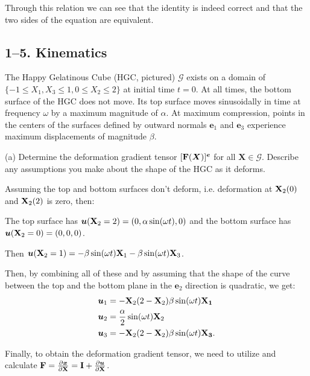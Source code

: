 Through this relation we can see that the identity is indeed correct and that the two sides of the equation are equivalent.

\newpage
\subsection*{1--5. \textbf{Kinematics}}
The Happy Gelatinous Cube (HGC, pictured) $\mathcal{G}$ exists on a domain of $\{-1\leq X_1 , X_3\leq1, 0\leq X_2 \leq 2\}$ at initial time $t=0$. 
At all times, the bottom surface of the HGC does not move. 
Its top surface moves sinusoidally in time at frequency $\omega$ by a maximum magnitude of $\alpha$. 
At maximum compression, points in the centers of the surfaces defined by outward normals $\bm{e}_1$ and $\bm{e}_3$ experience maximum displacements of magnitude $\beta$. 

\begin{figure}[h!]
\centering
{}
\end{figure}

\medskip
(a) Determine the deformation gradient tensor $[\mathbf{F}(\bm{X})]^{\bm{e}}$ for all $\bm{X}\in \mathcal{G}$. 
Describe any assumptions you make about the shape of the HGC as it deforms.

Assuming the top and bottom surfaces don't deform, i.e. deformation at $\mathbf{X}_2 (0)$ and $\mathbf{X}_2 (2)$ is zero, then:

The top surface has $\bm{u} (\mathbf{X}_2 = 2) = (0, \alpha \sin (\omega t), 0)$ and the bottom surface has $\bm{u} (\mathbf{X}_2 = 0) = (0, 0, 0)$.

Then $\bm{u} (\mathbf{X}_2 = 1) = -\beta \sin (\omega t) \mathbf{X}_1 - \beta \sin (\omega t) \mathbf{X}_3$.

Then, by combining all of these and by assuming that the shape of the curve between the top and the bottom plane in the $\bm{e}_2$ direction is quadratic, we get:
\begin{align*}
    \bm{u}_1 &= -\mathbf{X}_2 (2-\mathbf{X}_2) \beta \sin (\omega t) \mathbf{X_1}\\
    \bm{u}_2 &= \frac{\alpha}{2} \sin (\omega t) \mathbf{X}_2\\
    \bm{u}_3 &= -\mathbf{X}_2 (2-\mathbf{X}_2) \beta \sin (\omega t) \mathbf{X_3}.
\end{align*}

Finally, to obtain the deformation gradient tensor, we need to utilize and calculate $\mathbf{F} = \frac{\partial \bm{x}}{\partial \mathbf{X}} = \mathbf{I} + \frac{\partial \bm{u}}{\partial \mathbf{X}}$.

